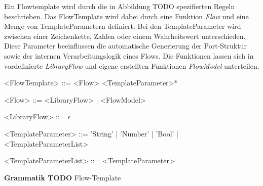 \documentclass{article}
\begin{document}
    Ein Flowtemplate wird durch die in Abbildung TODO spezifierten Regeln beschrieben.
    Das FlowTemplate wird dabei durch eine Funktion \textit{Flow} und eine Menge von TemplateParametern definiert. 
    Bei den TemplateParameter wird zwischen einer Zeichenkette, Zahlen oder einem Wahrheitswert unterschieden. 
    Diese Parameter beeinflussen die automatische Generierung der Port-Struktur sowie der internen Verarbeitungslogik eines Flows. \cite{99}
    Die Funktionen lassen sich in vordefinierte \textit{LibraryFlow} und eigene erstellten Funktionen \textit{FlowModel} unterteilen.\\
    \begin{grammar}
        <FlowTemplate> ::= <Flow> <TemplateParameter>*

        <Flow> ::= <LibraryFlow> | <FlowModel>
        
        <LibraryFlow> ::= $\epsilon$

        <TemplateParameter> ::= 'String' | 'Number' | 'Bool' | <TemplateParameterList>
        
        <TemplateParameterList> ::= <TemplateParameter>
    \end{grammar}
    \textbf{Grammatik TODO} Flow-Template\\
    \\
\end{document}
